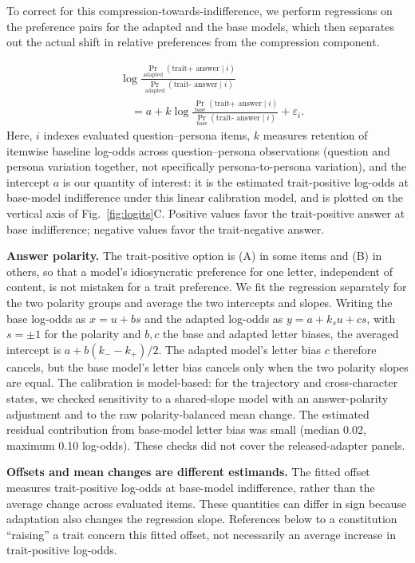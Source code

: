 \documentclass{article}
\begin{document}
To correct for this compression-towards-indifference, we perform regressions on the preference pairs for the adapted and the base models, which then separates out the actual shift in relative preferences from the compression component. 

\begin{equation}
\begin{aligned}
&\log \frac{
    \Pr_{\mathrm{adapted}}(\text{trait+ answer}\mid i)
}{
    \Pr_{\mathrm{adapted}}(\text{trait- answer}\mid i)
}\\
&\quad= a + k \log \frac{
    \Pr_{\mathrm{base}}(\text{trait+ answer}\mid i)
}{
    \Pr_{\mathrm{base}}(\text{trait- answer}\mid i)
}
+ \varepsilon_i .
\end{aligned}
\end{equation}
Here, $i$ indexes evaluated question--persona items, $k$
measures retention of itemwise baseline log-odds across question--persona observations (question and persona variation together, not specifically persona-to-persona variation), and the intercept $a$ is our quantity of interest: it is the estimated trait-positive log-odds at base-model indifference under this linear calibration model, and is plotted on the vertical axis of
Fig.~\ref{fig:logits}C. Positive values favor the
trait-positive answer at base indifference; negative values favor the
trait-negative answer.

\textbf{Answer polarity.} The trait-positive option is (A) in some items and (B) in others, so that a model's idiosyncratic preference for one letter, independent of content, is not mistaken for a trait preference. We fit the regression separately for the two polarity groups and average the two intercepts and slopes. Writing the base log-odds as $x=u+bs$ and the adapted log-odds as $y=a+k_s u+cs$, with $s=\pm1$ for the polarity and $b,c$ the base and adapted letter biases, the averaged intercept is $a+b(k_-{-}k_+)/2$. The adapted model's letter bias $c$ therefore cancels, but the base model's letter bias cancels only when the two polarity slopes are equal. The calibration is model-based: for the trajectory and cross-character states, we checked sensitivity to a shared-slope model with an answer-polarity adjustment and to the raw polarity-balanced mean change. The estimated residual contribution from base-model letter bias was small (median 0.02, maximum 0.10 log-odds). These checks did not cover the released-adapter panels.

\textbf{Offsets and mean changes are different estimands.} The fitted offset measures trait-positive log-odds at base-model indifference, rather than the average change across evaluated items. These quantities can differ in sign because adaptation also changes the regression slope. References below to a constitution “raising” a trait concern this fitted offset, not necessarily an average increase in trait-positive log-odds.
\end{document}
